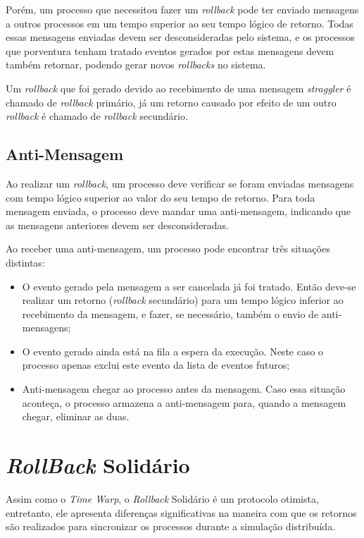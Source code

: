 Porém, um processo que necessitou fazer um \textit{rollback} pode ter enviado mensagens a outros processos em um tempo superior ao seu tempo lógico de retorno. Todas essas mensagens enviadas devem ser desconsideradas pelo sistema, e os processos que porventura tenham tratado eventos gerados por estas mensagens devem também retornar, podendo gerar novos \textit{rollbacks} no sistema.

Um \textit{rollback} que foi gerado devido ao recebimento de uma mensagem \textit{straggler} é chamado de \textit{rollback} primário, já um retorno causado por efeito de um outro \textit{rollback} é chamado de \textit{rollback} secundário.

\subsection{Anti-Mensagem}
Ao realizar um \textit{rollback}, um processo deve verificar se foram enviadas mensagens com tempo lógico superior ao valor do seu tempo de retorno. Para toda mensagem enviada, o processo deve mandar uma anti-mensagem, indicando que as mensagens anteriores devem ser desconsideradas.

Ao receber uma anti-mensagem, um processo pode encontrar três situações distintas:
\begin{itemize}
	\item O evento gerado pela mensagem a ser cancelada já foi tratado. Então deve-se realizar um retorno (\textit{rollback} secundário) para um tempo lógico inferior ao recebimento da mensagem, e fazer, se necessário, também o envio de anti-mensagens;

	\item O evento gerado ainda está na fila a espera da execução. Neste caso o processo apenas exclui este evento da lista de eventos futuros;

	\item Anti-mensagem chegar ao processo antes da mensagem. Caso essa situação aconteça, o processo armazena a anti-mensagem para, quando a mensagem chegar, eliminar as duas.
\end{itemize}

\section{\textit{RollBack} Solidário}

	Assim como o \textit{Time Warp}, o \textit{Rollback} Solidário é um protocolo otimista, entretanto, ele apresenta diferenças significativas na maneira com que os retornos são realizados para sincronizar os processos durante a simulação distribuída.
	
